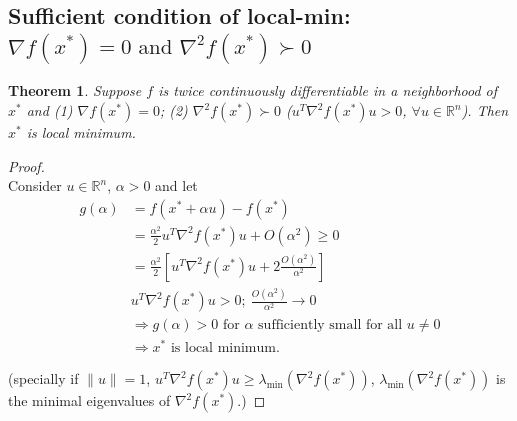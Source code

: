 \documentclass[11pt,a4paper]{article}
\newtheorem{theorem}{Theorem}
\begin{document}
\subsection*{Sufficient condition of local-min: $\nabla f(x^*)=0\text{ and }\nabla^2 f(x^*)\succ 0$}
\begin{theorem}
Suppose $f$ is twice continuously differentiable in a neighborhood of $x^*$ and
(1) $\nabla f(x^*)=0$; (2) $\nabla^2 f(x^*)\succ 0$ ($u^T\nabla^2 f(x^*) u>0$, $\forall u\in \mathbb{R}^n$).
Then $x^*$ is local minimum.
\end{theorem}
\begin{proof}
\quad\\
Consider $u\in \mathbb{R}^n$, $\alpha>0$ and let
\begin{equation}
    \begin{aligned}
        g(\alpha)&=f(x^*+\alpha u)-f(x^*)\\
        &=\frac{\alpha^2}{2}u^T\nabla^2 f(x^*) u+O(\alpha^2)\geq 0\\
        &=\frac{\alpha^2}{2}[u^T\nabla^2 f(x^*) u+2\frac{O(\alpha^2)}{\alpha^2}]\\
        &u^T\nabla^2 f(x^*) u>0;\ \frac{O(\alpha^2)}{\alpha^2}\rightarrow 0\\
        &\Rightarrow g(\alpha)>0\text{ for }\alpha\text{ sufficiently small for all }u\neq 0\\
        &\Rightarrow x^*\text{ is local minimum}.
    \end{aligned}
    \nonumber
\end{equation}

(specially if $\|u\|=1$, $u^T\nabla^2 f(x^*) u\geq \lambda_{\min}(\nabla^2 f(x^*))$, $\lambda_{\min}(\nabla^2 f(x^*))$ is the minimal eigenvalues of $\nabla^2 f(x^*)$.)
\end{proof}
\end{document}
